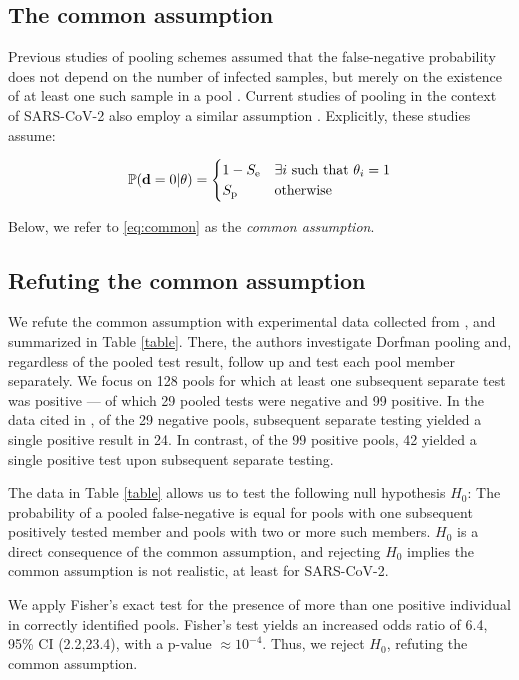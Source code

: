 \documentclass{article}
\begin{document}
\subsection*{The common assumption}\label{subsec:common}
Previous studies of pooling schemes assumed that the false-negative
probability does not depend on the number of infected samples, but
merely on the existence of at least one such sample in a pool
\cite{Kim, OptimalDorfmanPool}. Current studies of pooling in the
context of SARS-CoV-2 also employ a similar assumption
\cite{Simplistic1, Simplistic2}. Explicitly, these studies assume:

\begin{align}\label{eq:common}
  \mathbb{P}(\mathbf{d}=0|\theta) = 
  \begin{cases} 
    1-S_{\text{e}} & \exists i\ \text{such that } \theta_i = 1\\
    S_{\text{p}} & \text{otherwise}
  \end{cases} 
\end{align}

Below, we refer to \eqref{eq:common} as the \emph{common
  assumption}. 

\subsection*{Refuting the common assumption}\label{subsec:refute}
We refute the common assumption with experimental data collected from
\cite{Salazar}, and summarized in Table \ref{table}. There, the
authors investigate Dorfman pooling and, regardless of the pooled test
result, follow up and test each pool member separately. We focus on
128 pools for which at least one subsequent separate test was positive
--- of which 29 pooled tests were negative and 99 positive. In the
data cited in \cite{Salazar}, of the 29 negative pools, subsequent
separate testing yielded a single positive result in 24. In contrast,
of the 99 positive pools, 42 yielded a single positive test upon
subsequent separate testing.

The data in Table \ref{table} allows us to test the following null
hypothesis $H_0$: The probability of a pooled false-negative is equal
for pools with one subsequent positively tested member and pools with
two or more such members. $H_0$ is a direct consequence of the common
assumption, and rejecting $H_0$ implies the common assumption is not
realistic, at least for SARS-CoV-2.

We apply Fisher's exact test for the presence of more than one
positive individual in correctly identified pools. Fisher's test
yields an increased odds ratio of 6.4, 95\% CI (2.2,23.4), with a
p-value $\approx 10^{-4}$. Thus, we reject $H_0$, refuting the common
assumption.
\end{document}
